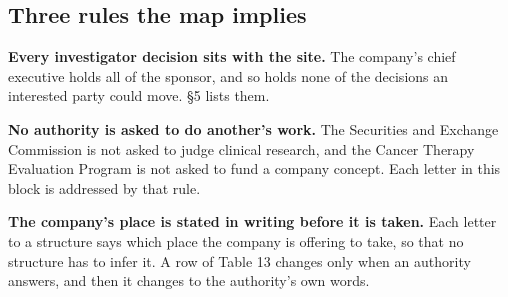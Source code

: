 \subsection{Three rules the map implies}

\textbf{Every investigator decision sits with the site.} The company's chief
executive holds all of the sponsor, and so holds none of the decisions an
interested party could move. \S5 lists them.

\textbf{No authority is asked to do another's work.} The Securities and Exchange
Commission is not asked to judge clinical research, and the Cancer Therapy
Evaluation Program is not asked to fund a company concept. Each letter in this
block is addressed by that rule.

\textbf{The company's place is stated in writing before it is taken.} Each letter
to a structure says which place the company is offering to take, so that no
structure has to infer it. A row of Table 13 changes only when an authority
answers, and then it changes to the authority's own words.
